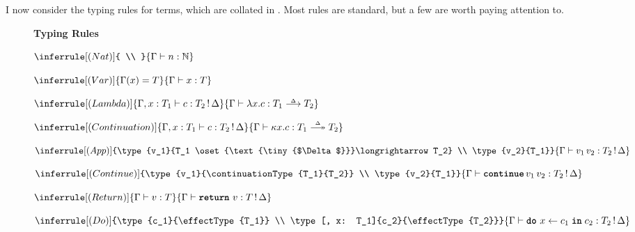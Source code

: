 I now consider the typing rules for terms, which are collated in . Most rules are standard, but a few are worth paying attention to. 

\begin{figure}
  \begin{eff-desc}
    {\large\textbf{Typing Rules}}\\
    
    {
    \centering 
    \begin{minipage}[t]{0.2\textwidth}
      \centering
      $\inferrule[(Nat)]
      { \\ }
      {\type{n}{\mathbb{N}}}$
      \end{minipage}%
  \begin{minipage}[t]{0.2\textwidth}
    \centering
  $\inferrule[(Var)]
  {\Gamma(x) = T}
  {\type{x}{T}}$
  \end{minipage}%
  \begin{minipage}[t]{0.3\textwidth}
    \centering
  $\inferrule[(Lambda)]
    {\type[, x:T_1]{c}{\effectType{T_2}}}
    {\type{\function{x}{c}}{\functionType{T_1}{T_2}}}$
  \end{minipage}%
  \begin{minipage}[t]{0.3\textwidth}
  \centering
$\inferrule[(Continuation)]
  {\type[, x:T_1]{c}{\effectType{T_2}}}
  {\type{\continuation{x}{c}}{\continuationType{T_1}{T_2}}}$
\end{minipage}
  
  \vspace{5mm}
  
  \begin{minipage}[t]{0.5\textwidth}
    \centering
  $\inferrule[(App)]
    {\type{v_1}{T_1 \oset{\text{\tiny{$\Delta$}}}\longrightarrow T_2} \\ \type{v_2}{T_1}}
    {\type{v_1 \, v_2}{\effectType{T_2}}}$
  \end{minipage}%
  \begin{minipage}[t]{0.5\textwidth}
    \centering
  $\inferrule[(Continue)]
    {\type{v_1}{\continuationType{T_1}{T_2}} \\ \type{v_2}{T_1}}
    {\type{\continue{v_1}{v_2}}{\effectType{T_2}}}$
  \end{minipage}

  \vspace{5mm}

  \begin{minipage}[t]{0.3\textwidth}
    \centering
  $\inferrule[(Return)]
    {\type{v}{T}}
    {\type{\return{v}}{\effectType{T}}}$
  \end{minipage}%
  \begin{minipage}[t]{0.55\textwidth}
    \centering
  $\inferrule[(Do)]
    {\type{c_1}{\effectType{T_1}} \\ \type[, x: T_1]{c_2}{\effectType{T_2}}}
    {\type{\bind{x}{c_1}{c_2}}{\effectType{T_2}}}$
  \end{minipage}
  
}
\end{eff-desc}
\end{figure}
